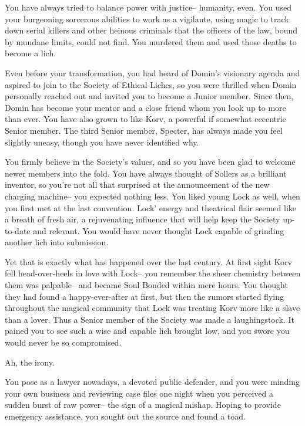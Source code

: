 \documentclass[char]{Sel}
\begin{document}
\name{\cTyran{}}  %
You have always tried to balance power with justice-- humanity, even. You used your burgeoning sorcerous abilities to work as a vigilante, using magic to track down serial killers and other heinous criminals that the officers of the law, bound by mundane limits, could not find. You murdered them and used those deaths to become a lich.

Even before your transformation, you had heard of Domin’s visionary agenda and aspired to join to the Society of Ethical Liches, so you were thrilled when Domin personally reached out and invited you to become a Junior member. Since then, Domin has become your mentor and a close friend whom you look up to more than ever. You have also grown to like Korv, a powerful if somewhat eccentric Senior member. The third Senior member, Specter, has always made you feel slightly uneasy, though you have never identified why.

You firmly believe in the Society's values, and so you have been glad to welcome newer members into the fold. You have always thought of Sollers as a brilliant inventor, so you're not all that surprised at the announcement of the new charging machine-- you expected nothing less. You liked young Lock as well, when you first met at the last convention. Lock' energy and theatrical flair seemed like a breath of fresh air, a rejuvenating influence that will help keep the Society up-to-date and relevant. You would have never thought Lock capable of grinding another lich into submission.

Yet that is exactly what has happened over the last century. At first sight Korv fell head-over-heels in love with Lock-- you remember the sheer chemistry between them was palpable-- and became Soul Bonded within mere hours. You thought they had found a happy-ever-after at first, but then the rumors started flying throughout the magical community that Lock was treating Korv more like a slave than a lover. Thus a Senior member of the Society was made a laughingstock. It pained you to see such a wise and capable lich brought low, and you swore you would never be so compromised.

Ah, the irony.

You pose as a lawyer nowadays, a devoted public defender, and you were minding your own business and reviewing case files one night when you perceived a sudden burst of raw power-- the sign of a magical mishap. Hoping to provide emergency assistance, you sought out the source and found a toad. 
\end{document}
